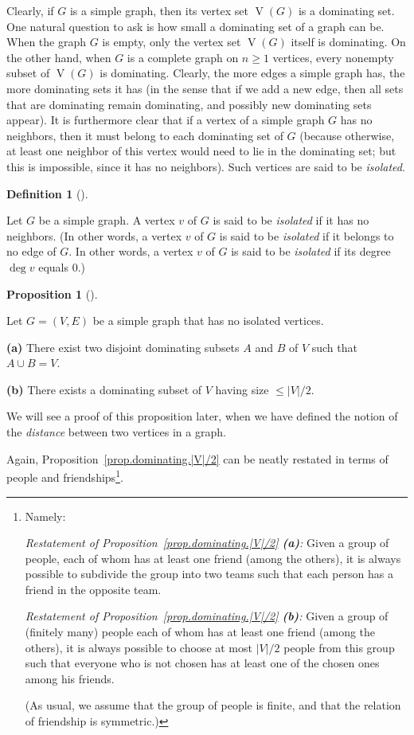 \documentclass[numbers=enddot,12pt,final,onecolumn,notitlepage]{scrartcl}%
\theoremstyle{definition}
\newtheorem{prop}[theo]{Proposition}
\newenvironment{proposition}[1][]
{\begin{prop}[#1]\begin{leftbar}}
{\end{leftbar}\end{prop}}
\newtheorem{defi}[theo]{Definition}
\newenvironment{definition}[1][]
{\begin{defi}[#1]\begin{leftbar}}
{\end{leftbar}\end{defi}}
\newcommand{\abs}[1]{\left| #1 \right|}
\newcommand{\tup}[1]{\left( #1 \right)}
\newcommand{\verts}[1]{\operatorname{V}\left( #1 \right)}
\begin{document}
Clearly, if $G$ is a simple graph, then its vertex set $\verts{G}$ is
a dominating set.
One natural question to ask is how small a dominating set of a graph
can be. When the graph $G$ is empty, only the vertex set $\verts{G}$
itself is dominating. On the other hand, when $G$ is a complete graph
on $n \geq 1$ vertices, every nonempty subset of $\verts{G}$ is
dominating. Clearly, the more edges a simple graph has, the more
dominating sets it has (in the sense that if we add a new edge, then
all sets that are dominating remain dominating, and possibly new
dominating sets appear). It is furthermore clear that if a vertex of
a simple graph $G$ has no neighbors, then it must belong to each
dominating set of $G$ (because otherwise, at least one neighbor of
this vertex would need to lie in the dominating set; but this is
impossible, since it has no neighbors). Such vertices are said to be
\textit{isolated}.

\begin{definition} \label{def.intro.isolated}
Let $G$ be a simple graph. A vertex $v$ of $G$ is said to be
\textit{isolated} if it has no neighbors. (In other words, a vertex
$v$ of $G$ is said to be \textit{isolated} if it belongs to no edge
of $G$. In other words, a vertex
$v$ of $G$ is said to be \textit{isolated} if its degree $\deg v$
equals $0$.)
\end{definition}

\begin{proposition} \label{prop.dominating.|V|/2}
Let $G = \tup{V, E}$ be a simple graph that has no isolated vertices.

\textbf{(a)} There exist two disjoint dominating subsets $A$ and $B$
of $V$ such that $A \cup B = V$.

\textbf{(b)} There exists a dominating subset of $V$ having size
$\leq \abs{V}/2$.
\end{proposition}

We will see a proof of this proposition later, when we have defined
the notion of the \textit{distance} between two vertices in a graph.

Again, Proposition~\ref{prop.dominating.|V|/2} can be neatly restated
in terms of people and friendships\footnote{Namely:

\textit{Restatement of
Proposition~\ref{prop.dominating.|V|/2} \textbf{(a)}:} Given a group
of people, each of whom has at least one friend (among the others),
it is always possible to subdivide the group into two teams such that
each person has a friend in the opposite team.

\textit{Restatement of
Proposition~\ref{prop.dominating.|V|/2} \textbf{(b)}:} Given a group
of (finitely many) people each of whom has at least one friend (among
the others),
it is always possible to choose at most $\abs{V}/{2}$ people from this
group such that everyone who is not chosen has at least one of the
chosen ones among his friends.

(As usual, we assume that the group of people is finite, and that the
relation of friendship is symmetric.)}.
\end{document}

